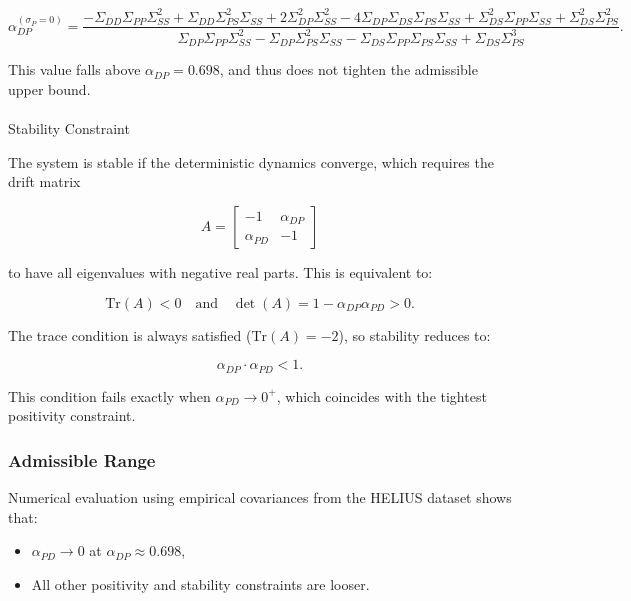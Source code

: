 \documentclass[
]{article}
\makeatletter
\let\oldparagraph\paragraph
\renewcommand{\paragraph}{
    \@ifstar
      \xxxParagraphStar
      \xxxParagraphNoStar
  }
\newcommand{\xxxParagraphStar}[1]{\oldparagraph*{#1}\mbox{}}
\newcommand{\xxxParagraphNoStar}[1]{\oldparagraph{#1}\mbox{}}
\providecommand{\tightlist}{%
  \setlength{\itemsep}{0pt}\setlength{\parskip}{0pt}}\usepackage{longtable,booktabs,array}
\makeatother
\begin{document}
\[
\alpha_{DP}^{(\sigma_P = 0)} =
\frac{
- \Sigma_{DD} \Sigma_{PP} \Sigma_{SS}^2 + \Sigma_{DD} \Sigma_{PS}^2 \Sigma_{SS}
+ 2 \Sigma_{DP}^2 \Sigma_{SS}^2 - 4 \Sigma_{DP} \Sigma_{DS} \Sigma_{PS} \Sigma_{SS}
+ \Sigma_{DS}^2 \Sigma_{PP} \Sigma_{SS} + \Sigma_{DS}^2 \Sigma_{PS}^2
}{
\Sigma_{DP} \Sigma_{PP} \Sigma_{SS}^2 - \Sigma_{DP} \Sigma_{PS}^2 \Sigma_{SS}
- \Sigma_{DS} \Sigma_{PP} \Sigma_{PS} \Sigma_{SS} + \Sigma_{DS} \Sigma_{PS}^3
}.
\]

This value falls above \(\alpha_{DP} = 0.698\), and thus does not
tighten the admissible upper bound.

\paragraph{Stability Constraint}\label{stability-constraint}

The system is stable if the deterministic dynamics converge, which
requires the drift matrix

\[
A = \begin{bmatrix}
-1 & \alpha_{DP} \\
\alpha_{PD} & -1
\end{bmatrix}
\]

to have all eigenvalues with negative real parts. This is equivalent to:

\[
\text{Tr}(A) < 0 \quad \text{and} \quad \det(A) = 1 - \alpha_{DP} \alpha_{PD} > 0.
\]

The trace condition is always satisfied (\(\text{Tr}(A) = -2\)), so
stability reduces to:

\[
\alpha_{DP} \cdot \alpha_{PD} < 1.
\]

This condition fails exactly when \(\alpha_{PD} \to 0^+\), which
coincides with the tightest positivity constraint.

\subsubsection{Admissible Range}\label{admissible-range}

Numerical evaluation using empirical covariances from the HELIUS dataset
shows that:

\begin{itemize}
\tightlist
\item
  \(\alpha_{PD} \to 0\) at \(\alpha_{DP} \approx 0.698\),
\item
  All other positivity and stability constraints are looser.
\end{itemize}
\end{document}
